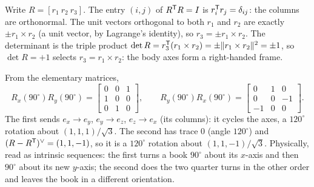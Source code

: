 \begin{solutions}
  \item Write $R = [r_1\ r_2\ r_3]$. The entry $(i, j)$ of $R^{\mathsf{T}} R = I$ is $r_i^{\mathsf{T}} r_j = \delta_{ij}$: the columns are orthonormal. The unit vectors orthogonal
        to both $r_1$ and $r_2$ are exactly $\pm r_1\times r_2$ (a unit vector, by Lagrange's identity), so $r_3 = \pm r_1\times r_2$. The determinant is the
        triple product $\det R = r_3^{\mathsf{T}}(r_1\times r_2) = \pm\|r_1\times r_2\|^2 = \pm1$, so $\det R = +1$ selects $r_3 = r_1\times r_2$: the body axes form a
        right-handed frame.

  \item From the elementary matrices,
        \[
          R_x(90^\circ)R_y(90^\circ) = \begin{bmatrix}0 & 0 & 1\\ 1 & 0 & 0\\ 0 & 1 & 0\end{bmatrix}, \qquad
          R_y(90^\circ)R_x(90^\circ) = \begin{bmatrix}0 & 1 & 0\\ 0 & 0 & -1\\ -1 & 0 & 0\end{bmatrix}.
        \]
        The first sends $e_x \to e_y$, $e_y \to e_z$, $e_z \to e_x$ (its columns): it cycles the axes, a $120^\circ$ rotation about $(1,1,1)/\sqrt3$. The
        second has trace 0 (angle $120^\circ$) and $(R - R^{\mathsf{T}})^{\vee} = (1, 1, -1)$, so it is a $120^\circ$ rotation about $(1, 1, -1)/\sqrt3$. Physically, read
        as intrinsic sequences: the first turns a book $90^\circ$ about its $x$-axis and then $90^\circ$ about its new $y$-axis; the second does the two
        quarter turns in the other order and leaves the book in a different orientation.


\end{solutions}
